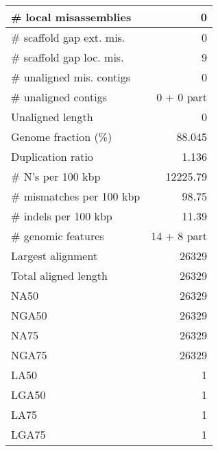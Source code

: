 \documentclass[12pt,a4paper]{article}
\begin{document}
\begin{table}[ht]
\begin{center}
\begin{tabular}{|l*{1}{|r}|}
\# local misassemblies & 0 \\ \hline
\# scaffold gap ext. mis. & 0 \\ \hline
\# scaffold gap loc. mis. & 9 \\ \hline
\# unaligned mis. contigs & 0 \\ \hline
\# unaligned contigs & 0 + 0 part \\ \hline
Unaligned length & 0 \\ \hline
Genome fraction (\%) & 88.045 \\ \hline
Duplication ratio & 1.136 \\ \hline
\# N's per 100 kbp & 12225.79 \\ \hline
\# mismatches per 100 kbp & 98.75 \\ \hline
\# indels per 100 kbp & 11.39 \\ \hline
\# genomic features & 14 + 8 part \\ \hline
Largest alignment & 26329 \\ \hline
Total aligned length & 26329 \\ \hline
NA50 & 26329 \\ \hline
NGA50 & 26329 \\ \hline
NA75 & 26329 \\ \hline
NGA75 & 26329 \\ \hline
LA50 & 1 \\ \hline
LGA50 & 1 \\ \hline
LA75 & 1 \\ \hline
LGA75 & 1 \\ \hline
\end{tabular}
\end{center}
\end{table}
\end{document}
